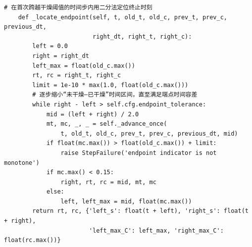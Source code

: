 \begin{Verbatim}[fontsize=\scriptsize,breaklines=true,breakanywhere=true]
    # 在首次跨越干燥阈值的时间步内用二分法定位终止时刻
    def _locate_endpoint(self, t, old_t, old_c, prev_t, prev_c, previous_dt,
                         right_dt, right_t, right_c):
        left = 0.0
        right = right_dt
        left_max = float(old_c.max())
        rt, rc = right_t, right_c
        limit = 1e-10 * max(1.0, float(old_c.max()))
        # 逐步缩小“未干燥—已干燥”时间区间，直至满足端点时间容差
        while right - left > self.cfg.endpoint_tolerance:
            mid = (left + right) / 2.0
            mt, mc, _, _ = self._advance_once(
                t, old_t, old_c, prev_t, prev_c, previous_dt, mid)
            if float(mc.max()) > float(old_c.max()) + limit:
                raise StepFailure('endpoint indicator is not monotone')
            if mc.max() < 0.15:
                right, rt, rc = mid, mt, mc
            else:
                left, left_max = mid, float(mc.max())
        return rt, rc, {'left_s': float(t + left), 'right_s': float(t + right),
                        'left_max_C': left_max, 'right_max_C': float(rc.max())}



\end{Verbatim}

